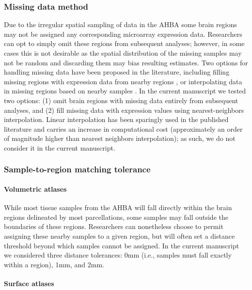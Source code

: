 \documentclass[12pt,aps,pra,reprint,showkeys]{revtex4-1}
\begin{document}
\subsubsection*{Missing data method}

Due to the irregular spatial sampling of data in the AHBA some brain regions may not be assigned any corresponding microarray expression data.
Researchers can opt to simply omit these regions from subsequent analyses; however, in some cases this is not desirable as the spatial distribution of the missing samples may not be random and discarding them may bias resulting estimates.
Two options for handling missing data have been proposed in the literature, including filling missing regions with expression data from nearby regions \citep[i.e., nearest-neighbors interpolation;][]{whitakervertes2016pnas}, or interpolating data in missing regions based on nearby samples \citep[i.e., linear interpolation;][]{burt2018natneuro}.
In the current manuscript we tested two options: (1) omit brain regions with missing data entirely from subsequent analyses, and (2) fill missing data with expression values using nearest-neighbors interpolation.
Linear interpolation has been sparingly used in the published literature \citep[e.g.,][]{burt2018natneuro, romerogarcia2018neuroimage} and carries an increase in computational cost (approximately an order of magnitude higher than nearest neighbors interpolation); as such, we do not consider it in the current manuscript.

\subsubsection*{Sample-to-region matching tolerance}

\paragraph*{Volumetric atlases}

While most tissue samples from the AHBA will fall directly within the brain regions delineated by most parcellations, some samples may fall outside the boundaries of these regions.
Researchers can nonetheless choose to permit assigning these nearby samples to a given region, but will often set a distance threshold beyond which samples cannot be assigned.
In the current manuscript we considered three distance tolerances: 0mm (i.e., samples must fall exactly within a region), 1mm, and 2mm.

\paragraph*{Surface atlases}
\end{document}
